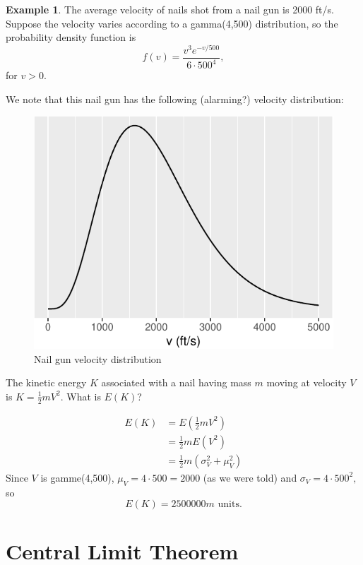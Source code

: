 \documentclass[
]{book}
\theoremstyle{definition}
\theoremstyle{definition}
\newtheorem{example}{Example}[chapter]
\theoremstyle{definition}
\theoremstyle{definition}
\theoremstyle{remark}
\begin{document}
\begin{example}
\protect\hypertarget{exm:nail-gun-velocity}{}\label{exm:nail-gun-velocity}The average velocity of nails shot from a nail gun is 2000 ft/s. Suppose the velocity varies according to a gamma(4,500) distribution, so the probability density function is \[f(v) = \frac{v^3e^{-v/500}}{6 \cdot 500^4},\] for \(v > 0\).

We note that this nail gun has the following (alarming?) velocity distribution:

\begin{figure}
\centering
\includegraphics{math340-notes_files/figure-latex/unnamed-chunk-24-1.pdf}
\caption{\label{fig:unnamed-chunk-24}Nail gun velocity distribution}
\end{figure}

The kinetic energy \(K\) associated with a nail having mass \(m\) moving at velocity \(V\) is \(K = \frac{1}{2}mV^2\). What is \(E(K)\)?

\begin{align*}
E(K) &= E(\frac{1}{2}mV^2)\\
      &= \frac{1}{2}m E(V^2) \\
      &= \frac{1}{2}m (\sigma_V^2 + \mu_V^2)
\end{align*}
Since \(V\) is gamme(4,500), \(\mu_V = 4 \cdot 500 = 2000\) (as we were told) and \(\sigma_V = 4\cdot 500^2,\)
so \[E(K) = 2500000m \text{ units}.\]
\end{example}

\chapter{Central Limit Theorem}\label{central-limit-theorem}
\end{document}
